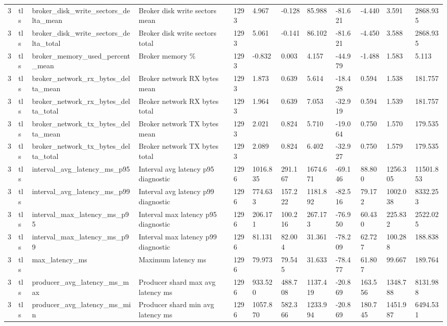 \begin{longtable}{llllllllllll}
3 & tls & broker\_disk\_write\_sectors\_delta\_mean & Broker disk write sectors mean & 1293 & 4.967 & -0.128 & 85.988 & -81.621 & -4.440 & 3.591 & 2868.935 \\
3 & tls & broker\_disk\_write\_sectors\_delta\_total & Broker disk write sectors total & 1293 & 5.061 & -0.141 & 86.102 & -81.621 & -4.450 & 3.588 & 2868.935 \\
3 & tls & broker\_memory\_used\_percent\_mean & Broker memory \% & 1293 & -0.832 & 0.003 & 4.157 & -44.979 & -1.488 & 1.583 & 5.113 \\
3 & tls & broker\_network\_rx\_bytes\_delta\_mean & Broker network RX bytes mean & 1293 & 1.873 & 0.639 & 5.614 & -18.428 & 0.594 & 1.538 & 181.757 \\
3 & tls & broker\_network\_rx\_bytes\_delta\_total & Broker network RX bytes total & 1293 & 1.964 & 0.639 & 7.053 & -32.919 & 0.594 & 1.539 & 181.757 \\
3 & tls & broker\_network\_tx\_bytes\_delta\_mean & Broker network TX bytes mean & 1293 & 2.021 & 0.824 & 5.710 & -19.064 & 0.750 & 1.570 & 179.535 \\
3 & tls & broker\_network\_tx\_bytes\_delta\_total & Broker network TX bytes total & 1293 & 2.089 & 0.824 & 6.402 & -32.927 & 0.750 & 1.579 & 179.535 \\
3 & tls & interval\_avg\_latency\_ms\_p95 & Interval avg latency p95 diagnostic & 1296 & 1016.835 & 291.167 & 1674.671 & -69.146 & 88.800 & 1256.305 & 11501.853 \\
3 & tls & interval\_avg\_latency\_ms\_p99 & Interval avg latency p99 diagnostic & 1296 & 774.633 & 157.222 & 1181.892 & -82.516 & 79.172 & 1002.038 & 8332.253 \\
3 & tls & interval\_max\_latency\_ms\_p95 & Interval max latency p95 diagnostic & 1296 & 206.171 & 100.216 & 267.173 & -76.950 & 60.430 & 225.832 & 2522.025 \\
3 & tls & interval\_max\_latency\_ms\_p99 & Interval max latency p99 diagnostic & 1296 & 81.131 & 82.004 & 31.361 & -78.209 & 62.727 & 100.288 & 188.838 \\
3 & tls & max\_latency\_ms & Maximum latency ms & 1296 & 79.973 & 79.545 & 31.633 & -78.477 & 61.807 & 99.667 & 189.764 \\
3 & tls & producer\_avg\_latency\_ms\_max & Producer shard max avg latency ms & 1296 & 933.520 & 488.708 & 1137.419 & -20.869 & 163.556 & 1348.788 & 8131.988 \\
3 & tls & producer\_avg\_latency\_ms\_min & Producer shard min avg latency ms & 1296 & 1057.870 & 582.366 & 1233.994 & -20.869 & 180.745 & 1451.987 & 6494.531 \\

\end{longtable}
